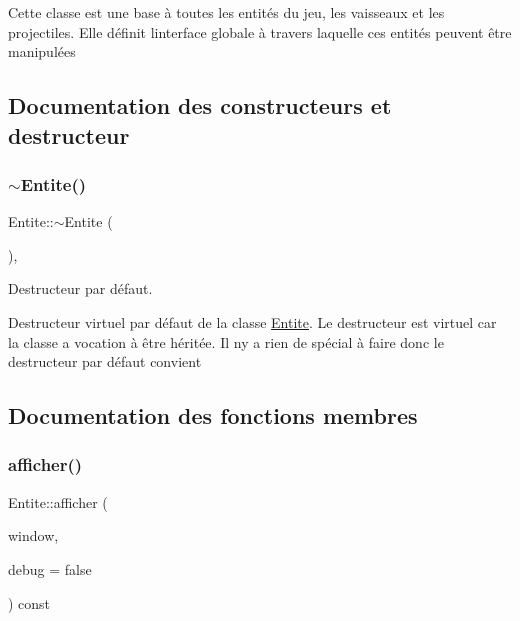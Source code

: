 Cette classe est une base à toutes les entités du jeu, les vaisseaux et les projectiles. Elle définit l\textquotesingle{}interface globale à travers laquelle ces entités peuvent être manipulées 

\subsection{Documentation des constructeurs et destructeur}
\mbox{\label{class_entite_a8084762a25afbfbcdca31121a3dfcd87}} 
\subsubsection{\texorpdfstring{$\sim$\+Entite()}{~Entite()}}
{\footnotesize\ttfamily Entite\+::$\sim$\+Entite (\begin{DoxyParamCaption}{ }\end{DoxyParamCaption})\hspace{0.3cm}{\ttfamily [virtual]}, {\ttfamily [default]}}



Destructeur par défaut. 

Destructeur virtuel par défaut de la classe \hyperlink{class_entite}{Entite}. Le destructeur est virtuel car la classe a vocation à être héritée. Il n\textquotesingle{}y a rien de spécial à faire donc le destructeur par défaut convient 

\subsection{Documentation des fonctions membres}
\mbox{\label{class_entite_a91874d7e87f6cb479a3893fbedc6a4e3}} 
\subsubsection{\texorpdfstring{afficher()}{afficher()}}
{\footnotesize\ttfamily Entite\+::afficher (\begin{DoxyParamCaption}\item[{sf\+::\+Render\+Window \&}]{window,  }\item[{bool}]{debug = {\ttfamily false} }\end{DoxyParamCaption}) const}



